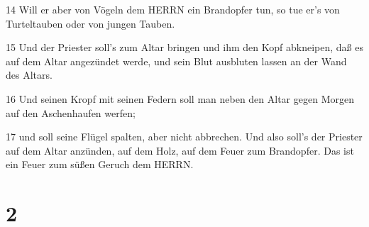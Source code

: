 \par 14 Will er aber von Vögeln dem HERRN ein Brandopfer tun, so tue er's von Turteltauben oder von jungen Tauben.
\par 15 Und der Priester soll's zum Altar bringen und ihm den Kopf abkneipen, daß es auf dem Altar angezündet werde, und sein Blut ausbluten lassen an der Wand des Altars.
\par 16 Und seinen Kropf mit seinen Federn soll man neben den Altar gegen Morgen auf den Aschenhaufen werfen;
\par 17 und soll seine Flügel spalten, aber nicht abbrechen. Und also soll's der Priester auf dem Altar anzünden, auf dem Holz, auf dem Feuer zum Brandopfer. Das ist ein Feuer zum süßen Geruch dem HERRN.

\chapter{2}

